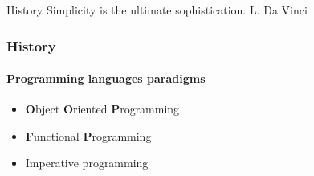 \begin{sepframe}{History}
    {\scriptsize{Simplicity is the ultimate sophistication. L. Da Vinci}}
\end{sepframe}

\begin{frame}[fragile,c]
\end{frame}

\begin{frame}
    \frametitle{History}
    \framesubtitle{Programming languages paradigms}

    \begin{itemize}[<+->]
        \item \textbf{O}bject \textbf{O}riented \textbf{P}rogramming
        \item \textbf{F}unctional \textbf{P}rogramming
        \item Imperative programming
    \end{itemize}
\end{frame}

